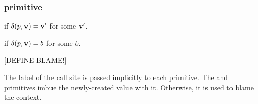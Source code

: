 \documentclass{sigplanconf}
\begin{document}
\subsubsection{primitive}
if $\delta(p,\mathbf{v})=\mathbf{v'}$ for some $\mathbf{v'}$.

if $\delta(p,\mathbf{v})=b$ for some $b$.

[DEFINE BLAME!]

The label of the call site is passed implicitly to each primitive.
The  and  primitives imbue the newly-created value with it.
Otherwise, it is used to blame the context.

\newcommand{\primone}[4]{$\delta$(#1,$\langle #2 \rangle$) &= $\langle #3 \rangle$ & #4}
\newcommand{\primtwo}[5]{$\delta$(#1,$\langle #2, #3 \rangle$) &= $\langle #4 \rangle$ & #5}
\newcommand{\primtwe}[4]{$\delta$(#1,$\langle #2, #3 \rangle$) &= $\ell$ & #4}
\newcommand{\primfou}[7]{$\delta$(#1,$\langle #2, #3, #4, #5\rangle$) &= $\langle #6 \rangle$ & #7}
\newcommand{\primfoe}[6]{$\delta$(#1,$\langle #2, #3, #4, #5\rangle$) &= $\ell$ & #6}
\end{document}

